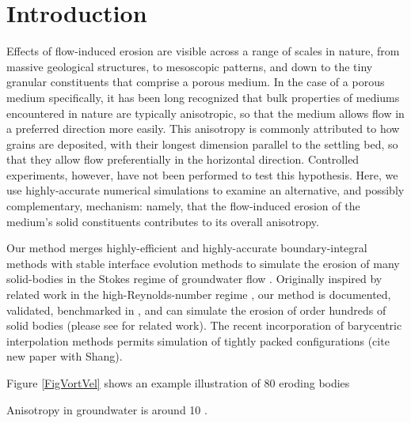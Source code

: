 \documentclass[3p]{elsarticle}
\begin{document}



\section{Introduction}

Effects of flow-induced erosion are visible across a range of scales in nature, from massive geological structures, to mesoscopic patterns, and down to the tiny granular constituents that comprise a porous medium. In the case of a porous medium specifically, it has been long recognized that bulk properties of mediums encountered in nature are typically anisotropic, so that the medium allows flow in a preferred direction more easily. This anisotropy is commonly attributed to how grains are deposited, with their longest dimension parallel to the settling bed, so that they allow flow preferentially in the horizontal direction. Controlled experiments, however, have not been performed to test this hypothesis. Here, we use highly-accurate numerical simulations to examine an alternative, and possibly complementary, mechanism: namely, that the flow-induced erosion of the medium's solid constituents contributes to its overall anisotropy.

Our method merges highly-efficient and highly-accurate boundary-integral methods with stable interface evolution methods to simulate the erosion of many solid-bodies in the Stokes regime of groundwater flow \cite{quaife2018boundary}. Originally inspired by related work in the high-Reynolds-number regime \cite{Ristroph2012, Moore2013, Huang2015, MooreCPAM2017}, our method is documented, validated, benchmarked in \cite{quaife2018boundary}, and can simulate the erosion of order hundreds of solid bodies (please see \cite{Mitchell2016} for related work). The recent incorporation of barycentric interpolation methods permits simulation of tightly packed configurations (cite new paper with Shang). 


Figure \ref{FigVortVel} shows an example illustration of 80 eroding bodies

Anisotropy in groundwater is around 10 \cite{anderson2015applied}.

\end{document}
